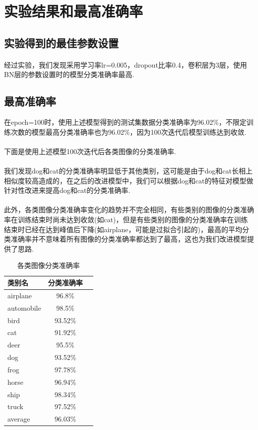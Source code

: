 \documentclass[11pt]{article}
\begin{document}
\section{实验结果和最高准确率}
\subsection{实验得到的最佳参数设置}
\paragraph{}经过实验，我们发现采用学习率lr=0.005，dropout比率0.4，卷积层为3层，使用BN层的参数设置时的模型分类准确率最高.
\subsection{最高准确率}
在epoch=100时，使用上述模型得到的测试集数据分类准确率为96.02\%，不限定训练次数的模型最高分类准确率也为96.02\%，因为100次迭代后模型训练达到收敛.
\paragraph{}下面是使用上述模型100次迭代后各类图像的分类准确率. \paragraph{}我们发现dog和cat的分类准确率明显低于其他类别，这可能是由于dog和cat长相上相似度较高造成的，在之后的改进模型中，我们可以根据dog和cat的特征对模型做针对性改进来提高dog和cat的分类准确率.
\paragraph{}此外，各类图像分类准确率变化的趋势并不完全相同，有些类别的图像的分类准确率在训练结束时尚未达到收敛(如cat)，但是有些类别的图像的分类准确率在训练结束时已经在达到峰值后下降(如airplane，可能是过拟合引起的)，最高的平均分类准确率并不意味着所有图像的分类准确率都达到了最高，这也为我们改进模型提供了思路.
\begin{table}[h!]
  \begin{center}
    \caption{各类图像分类准确率}
    \begin{tabular}{l|c|r}
      \textbf{类别名} & \textbf{分类准确率}\\
      \hline
      airplane & 96.8\% \\
      automobile & 98.5\% \\
      bird & 93.52\% \\
      cat & 91.92\% \\
      deer & 95.5\% \\
      dog & 93.52\% \\
      frog & 97.78\% \\
      horse & 96.94\% \\
      ship & 98.34\% \\
      truck & 97.52\% \\
      average & 96.03\% \\

    \end{tabular}
  \end{center}
\end{table}
\end{document}
